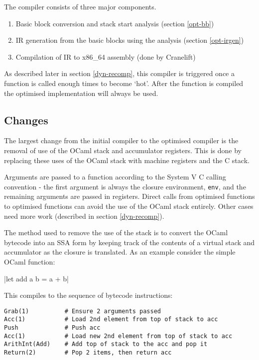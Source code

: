 The compiler consists of three major components.

\begin{enumerate}
      \item Basic block conversion and stack start analysis (section \ref{opt-bb})
      \item IR generation from the basic blocks using the analysis (section \ref{opt-irgen})
      \item Compilation of IR to x86\_64 assembly (done by Cranelift)
\end{enumerate}

As described later in section \ref{dyn-recomp}, this compiler is triggered once a function is
called enough times to become `hot'. After the function is compiled the optimised implementation
will always be used.

\subsection{Changes}

The largest change from the initial compiler to the optimised compiler is the removal of
use of the OCaml stack and accumulator registers. This is done by replacing these uses of the OCaml
stack with machine registers and the C stack.

Arguments are passed to a function according to the System V C calling convention - the first
argument is always the closure environment, \texttt{env}, and the remaining arguments are passed
in registers. Direct calls from optimised functions to optimised functions can avoid the use of
the OCaml stack entirely. Other cases need more work (described in section \ref{dyn-recomp}).

The method used to remove the use of the stack is to convert the OCaml bytecode into an SSA form
by keeping track of the contents of a virtual stack and accumulator as the closure is translated.
As an example consider the simple OCaml function:

|let add a b = a + b|

This compiles to the sequence of bytecode instructions:

\begin{verbatim}
Grab(1)          # Ensure 2 arguments passed
Acc(1)           # Load 2nd element from top of stack to acc
Push             # Push acc
Acc(1)           # Load new 2nd element from top of stack to acc
ArithInt(Add)    # Add top of stack to the acc and pop it
Return(2)        # Pop 2 items, then return acc
\end{verbatim}

